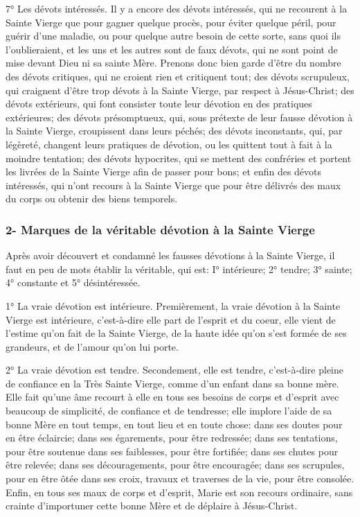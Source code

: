 7° Les dévots intéressés.
 Il y a encore des dévots intéressés, qui ne recourent à la Sainte Vierge que pour gagner quelque procès,
pour éviter quelque péril, pour guérir d'une maladie, ou pour quelque autre besoin de cette sorte, sans quoi ils
l'oublieraient, et les uns et les autres sont de faux dévots, qui ne sont point de mise devant Dieu ni sa sainte Mère.
 Prenons donc bien garde d'être du nombre des dévots critiques, qui ne croient rien et critiquent tout; des
dévots scrupuleux, qui craignent d'être trop dévots à la Sainte Vierge, par respect à Jésus-Christ; des dévots
extérieurs, qui font consister toute leur dévotion en des pratiques extérieures; des dévots présomptueux, qui, sous
prétexte de leur fausse dévotion à la Sainte Vierge, croupissent dans leurs péchés; des dévots inconstants, qui,
par légèreté, changent leurs pratiques de dévotion, ou les quittent tout à fait à la moindre tentation; des dévots
hypocrites, qui se mettent des confréries et portent les livrées de la Sainte Vierge afin de passer pour bons; et
enfin des dévots intéressés, qui n'ont recours à la Sainte Vierge que pour être délivrés des maux du corps ou
obtenir des biens temporels.

\subsubsection{2- Marques de la véritable dévotion à la Sainte Vierge}
 Après avoir découvert et condamné les fausses dévotions à la Sainte Vierge, il faut en peu de mots établir la
véritable, qui est: I° intérieure; 2° tendre; 3° sainte; 4° constante et 5° désintéressée.

1° La vraie dévotion est intérieure.
 Premièrement, la vraie dévotion à la Sainte Vierge est intérieure, c'est-à-dire elle part de l'esprit et du coeur,
elle vient de l'estime qu'on fait de la Sainte Vierge, de la haute idée qu'on s'est formée de ses grandeurs, et de
l'amour qu'on lui porte.

2° La vraie dévotion est tendre.
 Secondement, elle est tendre, c'est-à-dire pleine de confiance en la Très Sainte Vierge, comme d'un enfant
dans sa bonne mère. Elle fait qu'une âme recourt à elle en tous ses besoins de corps et d'esprit avec beaucoup de
simplicité, de confiance et de tendresse; elle implore l'aide de sa bonne Mère en tout temps, en tout lieu et en toute
chose: dans ses doutes pour en être éclaircie; dans ses égarements, pour être redressée; dans ses tentations,
pour être soutenue dans ses faiblesses, pour être fortifiée; dans ses chutes pour être relevée; dans ses
découragements, pour être encouragée; dans ses scrupules, pour en être ôtée dans ses croix, travaux et traverses
de la vie, pour être consolée. Enfin, en tous ses maux de corps et d'esprit, Marie est son recours ordinaire, sans
crainte d'importuner cette bonne Mère et de déplaire à Jésus-Christ.

